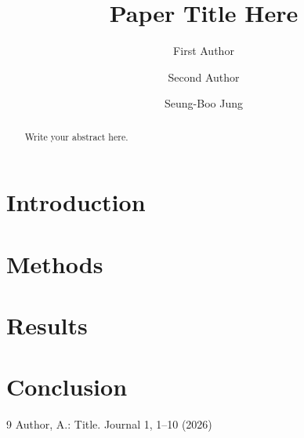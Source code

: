 \documentclass{llncs}
\begin{document}
\title{Paper Title Here}

\author{First Author \and Second Author \and Seung-Boo Jung}

\maketitle

\begin{abstract}
Write your abstract here.
\end{abstract}

\section{Introduction}

\section{Methods}

\section{Results}

\section{Conclusion}

\begin{thebibliography}{9}
 Author, A.: Title. Journal 1, 1--10 (2026)
\end{thebibliography}
\end{document}
